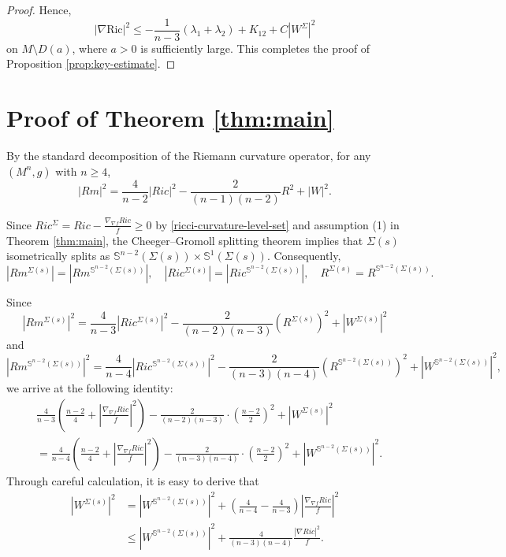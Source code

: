 \documentclass[a4, 12pt]{amsart}
\theoremstyle{plain}
\begin{document}
\begin{proof}
	Hence,
	\[
	|\nabla \mathrm{Ric}|^2 \leq -\frac{1}{n-3}(\lambda_1+\lambda_2) + K_{12} + C|W^{\Sigma}|^2
	\]
	on $M \setminus D(a)$, where $a > 0$ is sufficiently large. This completes the proof of Proposition \ref{prop:key-estimate}.
\end{proof}

\section{Proof of Theorem \ref{thm:main}}\label{sec:proof-main}

By the standard decomposition of the Riemann curvature operator, for any $(M^n, g)$ with $n \geq 4$,
\begin{equation*}\label{eq:curvature-decomposition}
	|Rm|^2 = \frac{4}{n-2}|Ric|^2 - \frac{2}{(n-1)(n-2)}R^2 + |W|^2.
\end{equation*}

Since $Ric^\Sigma = Ric - \frac{\nabla_{\nabla f}Ric}{f} \geq 0$ by \eqref{ricci-curvature-level-set} and assumption (1) in Theorem \ref{thm:main}, the Cheeger--Gromoll splitting theorem \cite{Cheeger-Gromoll} implies that $\Sigma(s)$ isometrically splits as $\mathbb{S}^{n-2}(\Sigma(s)) \times \mathbb{S}^1(\Sigma(s))$. Consequently,
\[
|Rm^{\Sigma(s)}| = |Rm^{\mathbb{S}^{n-2}(\Sigma(s))}|, \quad |Ric^{\Sigma(s)}| = |Ric^{\mathbb{S}^{n-2}(\Sigma(s))}|, \quad R^{\Sigma(s)} = R^{\mathbb{S}^{n-2}(\Sigma(s))}.
\]

Since
\begin{equation*}\label{eq:curvature-level-set}
	|Rm^{\Sigma(s)}|^2 = \frac{4}{n-3}|Ric^{\Sigma(s)}|^2 - \frac{2}{(n-2)(n-3)}(R^{\Sigma(s)})^2 + |W^{\Sigma(s)}|^2
\end{equation*}
and
\begin{equation*}\label{eq:curvature-sphere}
	|Rm^{\mathbb{S}^{n-2}(\Sigma(s))}|^2 = \frac{4}{n-4}|Ric^{\mathbb{S}^{n-2}(\Sigma(s))}|^2 - \frac{2}{(n-3)(n-4)}(R^{\mathbb{S}^{n-2}(\Sigma(s))})^2 + |W^{\mathbb{S}^{n-2}(\Sigma(s))}|^2,
\end{equation*}
we arrive at the following identity:
\begin{align*}
	&\frac{4}{n-3}\left(\frac{n-2}{4} + \left|\frac{\nabla_{\nabla f}Ric}{f}\right|^2\right) - \frac{2}{(n-2)(n-3)} \cdot \left(\frac{n-2}{2}\right)^2 + |W^{\Sigma(s)}|^2 \\
	&= \frac{4}{n-4}\left(\frac{n-2}{4} + \left|\frac{\nabla_{\nabla f}Ric}{f}\right|^2\right) - \frac{2}{(n-3)(n-4)} \cdot \left(\frac{n-2}{2}\right)^2 + |W^{\mathbb{S}^{n-2}(\Sigma(s))}|^2.
\end{align*}
Through careful calculation, it is easy to derive that
\begin{equation*}\label{eq:weyl-comparison}
	\begin{aligned}
		|W^{\Sigma(s)}|^2 &= |W^{\mathbb{S}^{n-2}(\Sigma(s))}|^2 + \left(\frac{4}{n-4} - \frac{4}{n-3}\right)\left|\frac{\nabla_{\nabla f}Ric}{f}\right|^2 \\
		&\leq |W^{\mathbb{S}^{n-2}(\Sigma(s))}|^2 + \frac{4}{(n-3)(n-4)}\frac{|\nabla Ric|^2}{f}.
	\end{aligned}
\end{equation*}
\end{document}
